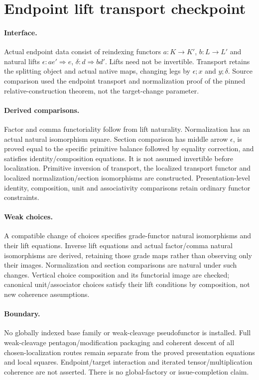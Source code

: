 \documentclass{article}
\begin{document}
\section*{Endpoint lift transport checkpoint}
\paragraph{Interface.} Actual endpoint data consist of reindexing functors $a:K\to K'$, $b:L\to L'$ and natural lifts $\epsilon:ae'\Rightarrow e$, $\delta:d\Rightarrow bd'$. Lifts need not be invertible. Transport retains the splitting object and actual native maps, changing legs by $\epsilon;x$ and $y;\delta$. Source comparison used the endpoint transport and normalization proof of the pinned relative-construction theorem, not the target-change parameter.
\paragraph{Derived comparisons.} Factor and comma functoriality follow from lift naturality. Normalization has an actual natural isomorphism square. Section comparison has middle arrow $\epsilon$, is proved equal to the specific primitive balance followed by equality correction, and satisfies identity/composition equations. It is not assumed invertible before localization. Primitive inversion of transport, the localized transport functor and localized normalization/section isomorphisms are constructed. Presentation-level identity, composition, unit and associativity comparisons retain ordinary functor constraints.
\paragraph{Weak choices.} A compatible change of choices specifies grade-functor natural isomorphisms and their lift equations. Inverse lift equations and actual factor/comma natural isomorphisms are derived, retaining those grade maps rather than observing only their images. Normalization and section comparisons are natural under such changes. Vertical choice composition and its functorial image are checked; canonical unit/associator choices satisfy their lift conditions by composition, not new coherence assumptions.
\paragraph{Boundary.} No globally indexed base family or weak-cleavage pseudofunctor is installed. Full weak-cleavage pentagon/modification packaging and coherent descent of all chosen-localization routes remain separate from the proved presentation equations and local squares. Endpoint/target interaction and iterated tensor/multiplication coherence are not asserted. There is no global-factory or issue-completion claim.
\end{document}
